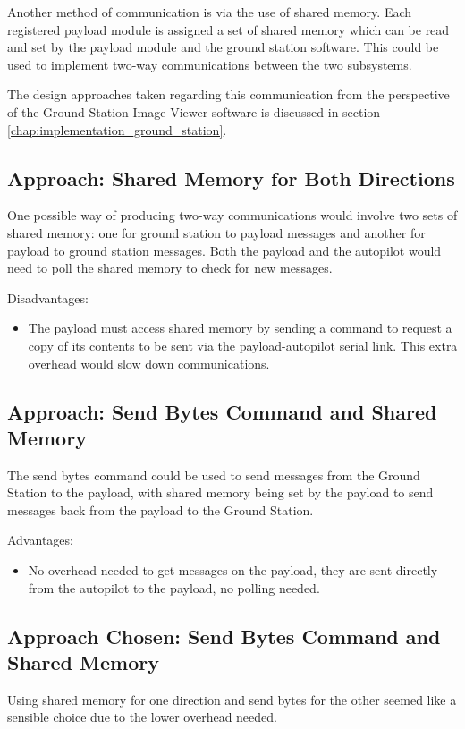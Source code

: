 Another method of communication is via the use of shared memory. Each registered payload module is assigned a set of shared memory which can be read and set by the payload module and the ground station software. This could be used to implement two-way communications between the two subsystems.

The design approaches taken regarding this communication from the perspective of the Ground Station Image Viewer software is discussed in section \ref{chap:implementation_ground_station}.

\subsection{Approach: Shared Memory for Both Directions}
One possible way of producing two-way communications would involve two sets of shared memory: one for ground station to payload messages and another for payload to ground station messages. Both the payload and the autopilot would need to poll the shared memory to check for new messages.


Disadvantages:
\begin{itemize}
\item The payload must access shared memory by sending a command to request a copy of its contents to be sent via the payload-autopilot serial link. This extra overhead would slow down communications.
\end{itemize}


\subsection{Approach: Send Bytes Command and Shared Memory}
The send bytes command could be used to send messages from the Ground Station to the payload, with shared memory being set by the payload to send messages back from the payload to the Ground Station.

Advantages:
\begin{itemize}
\item No overhead needed to get messages on the payload, they are sent directly from the autopilot to the payload, no polling needed.
\end{itemize}


\subsection{Approach Chosen: Send Bytes Command and Shared Memory}
Using shared memory for one direction and send bytes for the other seemed like a sensible choice due to the lower overhead needed.
